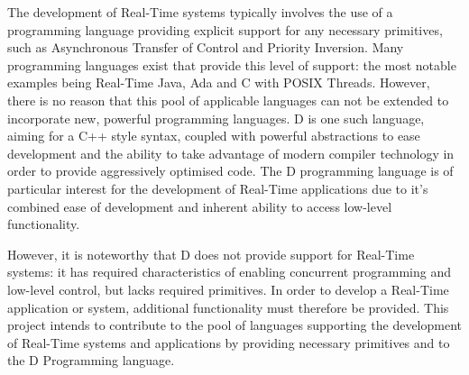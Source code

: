 The development of Real-Time systems typically involves the use of a programming 
language providing explicit support for any necessary primitives, such as 
Asynchronous Transfer of Control and Priority Inversion. 
Many programming languages exist that provide this level of support: the most 
notable examples being Real-Time Java, Ada and C with POSIX Threads. However, 
there is no reason that this pool of applicable languages can not be extended to 
incorporate new, powerful programming languages. 
D is one such language, aiming for a C++ style syntax, coupled with powerful 
abstractions to ease development and the ability to take advantage of modern 
compiler technology in order to provide aggressively optimised code.
The D programming language is of particular interest for 
the development of Real-Time applications due to it's combined ease of development
and inherent ability to access low-level functionality.
\par\bigskip\noindent
However, it is noteworthy that D does not provide support for Real-Time systems: 
it has required characteristics of enabling concurrent programming and low-level 
control, but lacks required primitives. 
In order to develop a Real-Time application or system, additional functionality 
must therefore be provided.
This project intends to contribute to the pool of languages supporting the development 
of Real-Time systems and applications by providing necessary primitives and 
to the D Programming language. 
